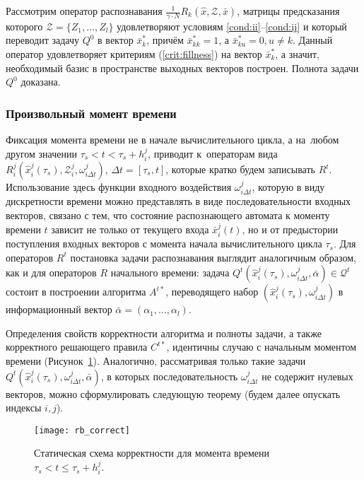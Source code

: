 \begin{Proof}
 Рассмотрим оператор распознавания $\frac{1}{\gamma\cdot N}R_k(\hat x,\mathcal Z,\bar x)$, матрицы предсказания которого $\mathcal Z=\{Z_1,\dots,Z_l\}$ удовлетворяют условиям \ref{cond:ii}--\ref{cond:ij} и который переводит задачу $Q^0$ в вектор $\bar x_k^*$, причём $\bar x_{kk}^*=1$, а $\bar x_{ku}^*=0, u\neq k$. Данный оператор удовлетворяет критериям (\ref{crit:fillness}) на вектор $\bar x_k^*$, а значит, необходимый базис в пространстве выходных векторов построен. Полнота задачи $Q^0$ доказана.
\end{Proof}

\subsubsection{Произвольный момент времени}
Фиксация момента времени не в начале вычислительного цикла, а на~любом другом значении $\tau_s<t<\tau_s+h_i^j$, приводит к~операторам вида $R_i^j(\hat x_i^j(\tau_s), \mathcal Z_i^j, \omega_{i\Delta t}^j)$, $\Delta t=[\tau_s, t]$, которые кратко будем записывать $R^t$. Использование здесь функции входного воздействия $\omega_{i\Delta t}^j$, которую в виду дискретности времени можно представлять в виде последовательности входных векторов, связано с тем, что состояние распознающего автомата к моменту времени $t$ зависит не только от текущего входа $\bar x_i^j(t)$, но и от предыстории поступления входных векторов с момента начала вычислительного цикла $\tau_s$. Для операторов $R^t$ постановка задачи распознавания выглядит аналогичным образом, как и для операторов $R$ начального времени: задача $Q^t(\hat x_i^j(\tau_s), \omega_{i\Delta t}^j, \bar\alpha)\in\mathcal Q^t$ состоит в построении алгоритма $A^{t*}$, переводящего набор $(\hat x_i^j(\tau_s), \omega_{i\Delta t}^j)$ в информационный вектор $\bar\alpha=(\alpha_1,\dots,\alpha_l)$. 

Определения свойств корректности алгоритма и полноты задачи, а также корректного решающего правила $C^{t*}$, идентичны случаю с начальным моментом времени (Рисунок~\ref{fig:rb_correct_statt}). Аналогично, рассматривая только такие задачи $Q^t(\hat x_i^j(\tau_s), \omega_{i\Delta t}^j, \bar\alpha)$, в которых последовательность $\omega_{i\Delta t}^j$ не содержит нулевых векторов, можно сформулировать следующую теорему (будем далее опускать индексы $i,j$).
	
\begin{figure}[h]
	\centering
	\texttt{[image: rb\_correct]}
	\caption{Статическая схема корректности для момента времени $\tau_s<t\leqslant\tau_s+h_i^j$.}
	\label{fig:rb_correct_statt}
\end{figure}
	
